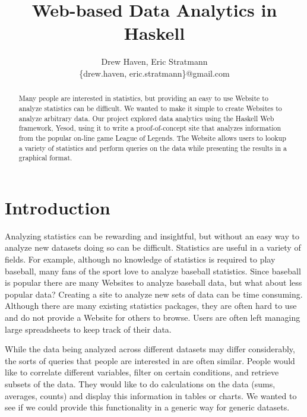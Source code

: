 \documentclass[letterpaper,twocolumn,9pt]{article}
\begin{document}
\title{\Large \bf Web-based Data Analytics in Haskell}

\date{}

\author{
{\rm Drew Haven, Eric Stratmann}\\
\{drew.haven, eric.stratmann\}@gmail.com
} %

\maketitle


\begin{abstract}
Many people are interested in statistics, but providing an easy to use Website to analyze statistics can be difficult. We wanted to make it simple to create Websites to analyze arbitrary data. Our project explored data analytics using the Haskell Web framework, Yesod, using it to write a proof-of-concept site that analyzes information from the popular on-line game League of Legends. The Website allows users to lookup a variety of statistics and perform queries on the data while presenting the results in a graphical format.
\end{abstract}

\section{Introduction}

Analyzing statistics can be rewarding and insightful, but without an easy way to analyze new datasets doing so can be difficult. Statistics are useful in a variety of fields. For example, although no knowledge of statistics is required to play baseball, many fans of the sport love to analyze baseball statistics. Since baseball is popular there are many Websites to analyze baseball data, but what about less popular data? Creating a site to analyze new sets of data can be time consuming. Although there are many existing statistics packages, they are often hard to use and do not provide a Website for others to browse. Users are often left managing large spreadsheets to keep track of their data.

 While the data being analyzed across different datasets may differ considerably, the sorts of queries that people are interested in are often similar. People would like to correlate different variables, filter on certain conditions, and retrieve subsets of the data. They would like to do calculations on the data (sums, averages, counts) and display this information in tables or charts. We wanted to see if we could provide this functionality in a generic way for generic datasets. 
\end{document}
